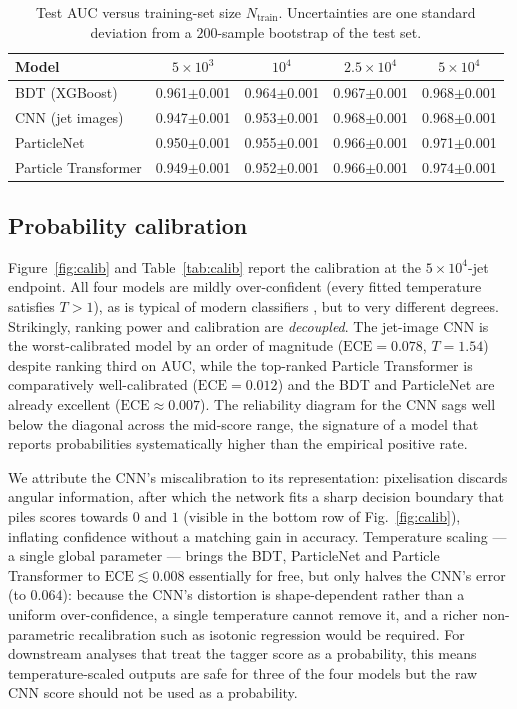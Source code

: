 \documentclass[preprint,12pt]{elsarticle}
\begin{document}
\begin{table}[t]
\centering
\caption{Test AUC versus training-set size $N_{\text{train}}$. Uncertainties
are one standard deviation from a $200$-sample bootstrap of the test set.}
\label{tab:efficiency}
\small
\setlength{\tabcolsep}{5pt}
\begin{tabular}{lcccc}
\toprule
Model & $5\!\times\!10^{3}$ & $10^{4}$ & $2.5\!\times\!10^{4}$ & $5\!\times\!10^{4}$ \\
\midrule
BDT (XGBoost)        & 0.961$\pm$0.001 & 0.964$\pm$0.001 & 0.967$\pm$0.001 & 0.968$\pm$0.001 \\
CNN (jet images)     & 0.947$\pm$0.001 & 0.953$\pm$0.001 & 0.968$\pm$0.001 & 0.968$\pm$0.001 \\
ParticleNet          & 0.950$\pm$0.001 & 0.955$\pm$0.001 & 0.966$\pm$0.001 & 0.971$\pm$0.001 \\
Particle Transformer & 0.949$\pm$0.001 & 0.952$\pm$0.001 & 0.966$\pm$0.001 & 0.974$\pm$0.001 \\
\bottomrule
\end{tabular}
\end{table}

\subsection{Probability calibration}
\label{sec:res-calibration}
Figure~\ref{fig:calib} and Table~\ref{tab:calib} report the calibration at
the $5\times10^{4}$-jet endpoint. All four models are mildly over-confident
(every fitted temperature satisfies $T>1$), as is typical of modern
classifiers \citep{guo2017calibration}, but to very different degrees.
Strikingly, ranking power and calibration are \emph{decoupled}. The jet-image
CNN is the worst-calibrated model by an order of magnitude
($\mathrm{ECE}=0.078$, $T=1.54$) despite ranking third on AUC, while the
top-ranked Particle Transformer is comparatively well-calibrated
($\mathrm{ECE}=0.012$) and the BDT and ParticleNet are already excellent
($\mathrm{ECE}\approx0.007$). The reliability diagram for the CNN sags well
below the diagonal across the mid-score range, the signature of a model that
reports probabilities systematically higher than the empirical positive rate.

We attribute the CNN's miscalibration to its representation: pixelisation
discards angular information, after which the network fits a sharp decision
boundary that piles scores towards $0$ and $1$ (visible in the bottom row of
Fig.~\ref{fig:calib}), inflating confidence without a matching gain in
accuracy. Temperature scaling --- a single global parameter --- brings the
BDT, ParticleNet and Particle Transformer to $\mathrm{ECE}\lesssim0.008$
essentially for free, but only halves the CNN's error (to $0.064$): because
the CNN's distortion is shape-dependent rather than a uniform over-confidence,
a single temperature cannot remove it, and a richer non-parametric
recalibration such as isotonic regression \citep{niculescu2005calibration}
would be required. For downstream analyses that treat the tagger score as a
probability, this means temperature-scaled outputs are safe for three of the
four models but the raw CNN score should not be used as a probability.
\end{document}
